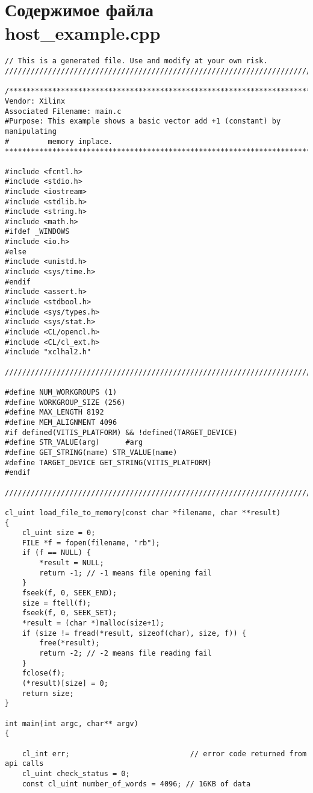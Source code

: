 \chapter{Содержимое файла host\_example.cpp}
\label{cha:appendix1}

\begin{lstlisting}[label=code:hostexample3, caption=Содержимое файла host\_example.cpp, basicstyle=\tiny]
// This is a generated file. Use and modify at your own risk.
////////////////////////////////////////////////////////////////////////////////

/*******************************************************************************
Vendor: Xilinx
Associated Filename: main.c
#Purpose: This example shows a basic vector add +1 (constant) by manipulating
#         memory inplace.
*******************************************************************************/

#include <fcntl.h>
#include <stdio.h>
#include <iostream>
#include <stdlib.h>
#include <string.h>
#include <math.h>
#ifdef _WINDOWS
#include <io.h>
#else
#include <unistd.h>
#include <sys/time.h>
#endif
#include <assert.h>
#include <stdbool.h>
#include <sys/types.h>
#include <sys/stat.h>
#include <CL/opencl.h>
#include <CL/cl_ext.h>
#include "xclhal2.h"

////////////////////////////////////////////////////////////////////////////////

#define NUM_WORKGROUPS (1)
#define WORKGROUP_SIZE (256)
#define MAX_LENGTH 8192
#define MEM_ALIGNMENT 4096
#if defined(VITIS_PLATFORM) && !defined(TARGET_DEVICE)
#define STR_VALUE(arg)      #arg
#define GET_STRING(name) STR_VALUE(name)
#define TARGET_DEVICE GET_STRING(VITIS_PLATFORM)
#endif

////////////////////////////////////////////////////////////////////////////////

cl_uint load_file_to_memory(const char *filename, char **result)
{
    cl_uint size = 0;
    FILE *f = fopen(filename, "rb");
    if (f == NULL) {
        *result = NULL;
        return -1; // -1 means file opening fail
    }
    fseek(f, 0, SEEK_END);
    size = ftell(f);
    fseek(f, 0, SEEK_SET);
    *result = (char *)malloc(size+1);
    if (size != fread(*result, sizeof(char), size, f)) {
        free(*result);
        return -2; // -2 means file reading fail
    }
    fclose(f);
    (*result)[size] = 0;
    return size;
}

int main(int argc, char** argv)
{

    cl_int err;                            // error code returned from api calls
    cl_uint check_status = 0;
    const cl_uint number_of_words = 4096; // 16KB of data



\end{lstlisting}
